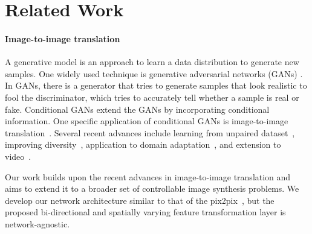 \documentclass[10pt,twocolumn,letterpaper]{article}
\newlength\paramargin
\begin{document}
\section{Related Work}
\label{sec:related}



\vspace{\paramargin}
\paragraph{Image-to-image translation}
A generative model is an approach to learn a data distribution to generate new samples. One widely used technique is generative adversarial networks (GANs) \cite{goodfellow2014generative}. In GANs, there is a generator that tries to generate samples that look realistic to fool the discriminator, which tries to accurately tell whether a sample is real or fake. Conditional GANs extend the GANs by incorporating conditional information. One specific application of conditional GANs is image-to-image translation~\cite{isola2017image,wang2017high,park2019semantic}. Several recent advances include learning from unpaired dataset~\cite{zhu2017unpaired,yi2017dualgan,liu2017unsupervised}, improving diversity~\cite{lee2018diverse,huang2018multimodal,zhu2017toward}, application to domain adaptation~\cite{bousmalis2017unsupervised,hoffman2018cycada,chen2019crdoco}, and extension to video~\cite{wang2018video}.

Our work builds upon the recent advances in image-to-image translation and aims to extend it to a broader set of controllable image synthesis problems. We develop our network architecture similar to that of the pix2pix~\cite{isola2017image}, but the proposed bi-directional and spatially varying feature transformation layer is network-agnostic. 

\vspace{\paramargin}
\end{document}
